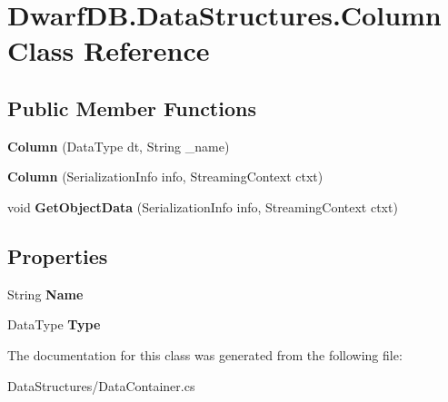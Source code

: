 \hypertarget{class_dwarf_d_b_1_1_data_structures_1_1_column}{
\section{DwarfDB.DataStructures.Column Class Reference}
\label{class_dwarf_d_b_1_1_data_structures_1_1_column}
}
\subsection*{Public Member Functions}
\begin{DoxyCompactItemize}
\item 
\hypertarget{class_dwarf_d_b_1_1_data_structures_1_1_column_af9e9d7c5a614be62d356217d07b75923}{
{\bfseries Column} (DataType dt, String \_\-name)}
\label{class_dwarf_d_b_1_1_data_structures_1_1_column_af9e9d7c5a614be62d356217d07b75923}

\item 
\hypertarget{class_dwarf_d_b_1_1_data_structures_1_1_column_abf5e30f6b3e6c498f0a66d02f7f17214}{
{\bfseries Column} (SerializationInfo info, StreamingContext ctxt)}
\label{class_dwarf_d_b_1_1_data_structures_1_1_column_abf5e30f6b3e6c498f0a66d02f7f17214}

\item 
\hypertarget{class_dwarf_d_b_1_1_data_structures_1_1_column_a4a4dd5bdf12ad2ab575b62f5a4315d17}{
void {\bfseries GetObjectData} (SerializationInfo info, StreamingContext ctxt)}
\label{class_dwarf_d_b_1_1_data_structures_1_1_column_a4a4dd5bdf12ad2ab575b62f5a4315d17}

\end{DoxyCompactItemize}
\subsection*{Properties}
\begin{DoxyCompactItemize}
\item 
\hypertarget{class_dwarf_d_b_1_1_data_structures_1_1_column_a731a4e7a643fd90916b3e54fe5712e9f}{
String {\bfseries Name}}
\label{class_dwarf_d_b_1_1_data_structures_1_1_column_a731a4e7a643fd90916b3e54fe5712e9f}

\item 
\hypertarget{class_dwarf_d_b_1_1_data_structures_1_1_column_a5221d8051286c8cddc890ab614d8580a}{
DataType {\bfseries Type}}
\label{class_dwarf_d_b_1_1_data_structures_1_1_column_a5221d8051286c8cddc890ab614d8580a}

\end{DoxyCompactItemize}


The documentation for this class was generated from the following file:\begin{DoxyCompactItemize}
\item 
DataStructures/DataContainer.cs\end{DoxyCompactItemize}
